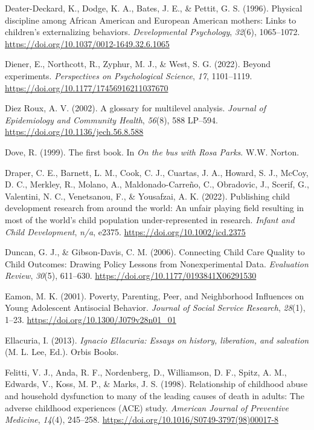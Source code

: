 \documentclass[
  letterpaper,
  DIV=11,
  numbers=noendperiod]{scrreprt}
\newlength{\cslhangindent}
\newenvironment{CSLReferences}[2] %
 {\begin{list}{}{%
  \setlength{\itemindent}{0pt}
  \setlength{\leftmargin}{0pt}
  \setlength{\parsep}{0pt}
  \ifodd #1
   \setlength{\leftmargin}{\cslhangindent}
   \setlength{\itemindent}{-1\cslhangindent}
  \fi
  \setlength{\itemsep}{#2\baselineskip}}}
 {\end{list}}
\begin{document}
\begin{CSLReferences}{1}{0}
Deater-Deckard, K., Dodge, K. A., Bates, J. E., \& Pettit, G. S. (1996).
{Physical discipline among African American and European American
mothers: Links to children's externalizing behaviors.}
\emph{Developmental Psychology}, \emph{32}(6), 1065--1072.
\url{https://doi.org/10.1037/0012-1649.32.6.1065}

Diener, E., Northcott, R., Zyphur, M. J., \& West, S. G. (2022). Beyond
experiments. \emph{Perspectives on Psychological Science}, \emph{17},
1101--1119. \url{https://doi.org/10.1177/17456916211037670}

Diez Roux, A. V. (2002). {A glossary for multilevel analysis}.
\emph{Journal of Epidemiology and Community Health}, \emph{56}(8), 588
LP--594. \url{https://doi.org/10.1136/jech.56.8.588}

Dove, R. (1999). The first book. In \emph{On the bus with {R}osa
{P}arks}. W.W. Norton.

Draper, C. E., Barnett, L. M., Cook, C. J., Cuartas, J. A., Howard, S.
J., McCoy, D. C., Merkley, R., Molano, A., Maldonado-Carreño, C.,
Obradovic, J., Scerif, G., Valentini, N. C., Venetsanou, F., \&
Yousafzai, A. K. (2022). Publishing child development research from
around the world: An unfair playing field resulting in most of the
world's child population under-represented in research. \emph{Infant and
Child Development}, \emph{n/a}, e2375.
\url{https://doi.org/10.1002/icd.2375}

Duncan, G. J., \& Gibson-Davis, C. M. (2006). {Connecting Child Care
Quality to Child Outcomes: Drawing Policy Lessons from Nonexperimental
Data}. \emph{Evaluation Review}, \emph{30}(5), 611--630.
\url{https://doi.org/10.1177/0193841X06291530}

Eamon, M. K. (2001). {Poverty, Parenting, Peer, and Neighborhood
Influences on Young Adolescent Antisocial Behavior}. \emph{Journal of
Social Service Research}, \emph{28}(1), 1--23.
\url{https://doi.org/10.1300/J079v28n01_01}

Ellacuria, I. (2013). \emph{{I}gnacio {E}llacuria: Essays on history,
liberation, and salvation} (M. L. Lee, Ed.). Orbis Books.

Felitti, V. J., Anda, R. F., Nordenberg, D., Williamson, D. F., Spitz,
A. M., Edwards, V., Koss, M. P., \& Marks, J. S. (1998). Relationship of
childhood abuse and household dysfunction to many of the leading causes
of death in adults: The adverse childhood experiences (ACE) study.
\emph{American Journal of Preventive Medicine}, \emph{14}(4), 245--258.
\url{https://doi.org/10.1016/S0749-3797(98)00017-8}


\end{CSLReferences}
\end{document}
